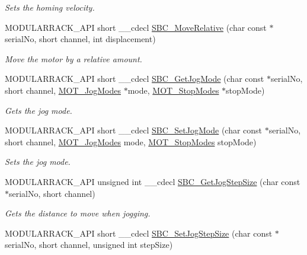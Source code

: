 \begin{DoxyCompactItemize}
\begin{DoxyCompactList}\small\item\em Sets the homing velocity. \end{DoxyCompactList}\item 
M\+O\+D\+U\+L\+A\+R\+R\+A\+C\+K\+\_\+\+A\+PI short \+\_\+\+\_\+cdecl \hyperlink{group___modular_stepper_ga01fd65ff27765c97232fbe7857c933ea}{S\+B\+C\+\_\+\+Move\+Relative} (char const $\ast$serial\+No, short channel, int displacement)
\begin{DoxyCompactList}\small\item\em Move the motor by a relative amount. \end{DoxyCompactList}\item 
M\+O\+D\+U\+L\+A\+R\+R\+A\+C\+K\+\_\+\+A\+PI short \+\_\+\+\_\+cdecl \hyperlink{group___modular_stepper_ga7203ed6006c1bb5679e4bac63b2df747}{S\+B\+C\+\_\+\+Get\+Jog\+Mode} (char const $\ast$serial\+No, short channel, \hyperlink{group___common_ga009eac484778f2873f249c8562d94a93}{M\+O\+T\+\_\+\+Jog\+Modes} $\ast$mode, \hyperlink{group___common_ga4b1f06d8365231862a18380e278c3c44}{M\+O\+T\+\_\+\+Stop\+Modes} $\ast$stop\+Mode)
\begin{DoxyCompactList}\small\item\em Gets the jog mode. \end{DoxyCompactList}\item 
M\+O\+D\+U\+L\+A\+R\+R\+A\+C\+K\+\_\+\+A\+PI short \+\_\+\+\_\+cdecl \hyperlink{group___modular_stepper_ga9f677fcca5b3474c9855a896b40bd943}{S\+B\+C\+\_\+\+Set\+Jog\+Mode} (char const $\ast$serial\+No, short channel, \hyperlink{group___common_ga009eac484778f2873f249c8562d94a93}{M\+O\+T\+\_\+\+Jog\+Modes} mode, \hyperlink{group___common_ga4b1f06d8365231862a18380e278c3c44}{M\+O\+T\+\_\+\+Stop\+Modes} stop\+Mode)
\begin{DoxyCompactList}\small\item\em Sets the jog mode. \end{DoxyCompactList}\item 
M\+O\+D\+U\+L\+A\+R\+R\+A\+C\+K\+\_\+\+A\+PI unsigned int \+\_\+\+\_\+cdecl \hyperlink{group___modular_stepper_ga73a757a5d2d0cf090c41047c5ed0ae9b}{S\+B\+C\+\_\+\+Get\+Jog\+Step\+Size} (char const $\ast$serial\+No, short channel)
\begin{DoxyCompactList}\small\item\em Gets the distance to move when jogging. \end{DoxyCompactList}\item 
M\+O\+D\+U\+L\+A\+R\+R\+A\+C\+K\+\_\+\+A\+PI short \+\_\+\+\_\+cdecl \hyperlink{group___modular_stepper_gaa34c709b2a1ff0418bf5c06c3c533f9a}{S\+B\+C\+\_\+\+Set\+Jog\+Step\+Size} (char const $\ast$serial\+No, short channel, unsigned int step\+Size)

\end{DoxyCompactItemize}
